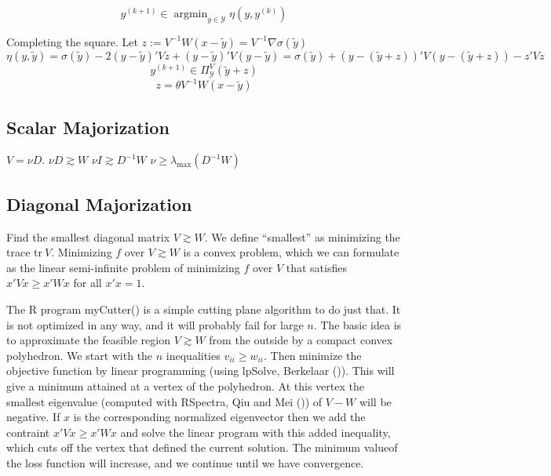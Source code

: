 \documentclass[
  12pt,
  letterpaper,
  DIV=11,
  numbers=noendperiod]{scrartcl}
\theoremstyle{plain}
\theoremstyle{remark}
\begin{document}
\begin{equation}
y^{(k+1)}\in\mathop{\text{argmin}}_{y\in\mathcal{Y}}\eta(y,y^{(k)})
\end{equation}

Completing the square. Let
\(z:=V^{-1}W(x-\tilde y)=V^{-1}\nabla\sigma(\tilde y)\) \[
\eta(y,\tilde y)=
\sigma(\tilde y)-2(y-\tilde y)'Vz+(y-\tilde y)'V(y - \tilde y)=
\sigma(\tilde y)+(y-(\tilde y+z))'V(y-(\tilde y+z))-z'Vz
\] \[
y^{(k+1)}\in\Pi_{\mathcal{Y}}^V(\tilde y+z)
\] \[
z=\theta V^{-1}W(x-\tilde y)
\]

\subsection{Scalar Majorization}\label{scalar-majorization}

\(V=\nu D\). \(\nu D\gtrsim W\) \(\nu I\gtrsim D^{-1}W\)
\(\nu\geq\lambda_{\text{max}}(D^{-1}W)\)

\subsection{Diagonal Majorization}\label{diagonal-majorization}

Find the smallest diagonal matrix \(V\gtrsim W\). We define ``smallest''
as minimizing the trace \(\text{tr}\ V\). Minimizing \(f\) over
\(V\gtrsim W\) is a convex problem, which we can formulate as the linear
semi-infinite problem of minimizing \(f\) over \(V\) that satisfies
\(x'Vx\geq x'Wx\) for all \(x'x=1\).

The R program myCutter() is a simple cutting plane algorithm to do just
that. It is not optimized in any way, and it will probably fail for
large \(n\). The basic idea is to approximate the feasible region
\(V\gtrsim W\) from the outside by a compact convex polyhedron. We start
with the \(n\) inequalities \(v_{ii}\geq w_{ii}\). Then minimize the
objective function by linear programming (using lpSolve, Berkelaar
()). This will give a minimum attained
at a vertex of the polyhedron. At this vertex the smallest eigenvalue
(computed with RSpectra, Qiu and Mei ())
of \(V-W\) will be negative. If \(x\) is the corresponding normalized
eigenvector then we add the contraint \(x'Vx\geq x'Wx\) and solve the
linear program with this added inequality, which cuts off the vertex
that defined the current solution. The minimum valueof the loss function
will increase, and we continue until we have convergence.
\end{document}

